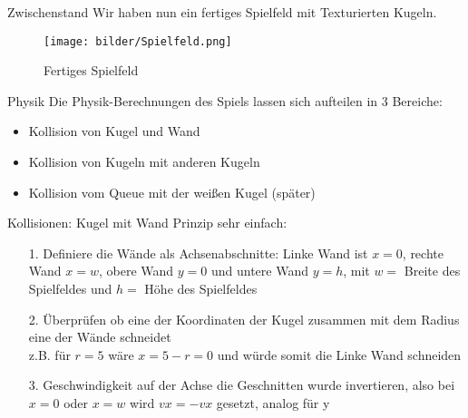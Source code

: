 \begin{frame}{Zwischenstand}
Wir haben nun ein fertiges Spielfeld mit Texturierten Kugeln.
\begin{figure}
	\caption{Fertiges Spielfeld}
	\texttt{[image: bilder/Spielfeld.png]}
\end{figure}
\end{frame}
\begin{frame}{Physik}
Die Physik-Berechnungen des Spiels lassen sich aufteilen in 3 Bereiche:
\begin{itemize}
	\item Kollision von Kugel und Wand
	\item Kollision von Kugeln mit anderen Kugeln
	\item Kollision vom Queue mit der weißen Kugel (später)
\end{itemize}
\end{frame}
\begin{frame}{Kollisionen: Kugel mit Wand}
Prinzip sehr einfach:
\begin{itemize}
	\item [1.] Definiere die Wände als Achsenabschnitte: Linke Wand ist $x=0$, rechte Wand $x=w$, obere Wand $y=0$ und untere Wand $y=h$, mit $w = $ Breite des Spielfeldes und $h = $ Höhe des Spielfeldes
	\item [2.] Überprüfen ob eine der Koordinaten der Kugel zusammen mit dem Radius eine der Wände schneidet \\
				z.B. für $r=5$ wäre $x = 5 - r = 0 $ und würde somit die Linke Wand schneiden
	\item [3.] Geschwindigkeit auf der Achse die Geschnitten wurde invertieren, also bei $x=0$ oder $x=w$ wird $vx = -vx$ gesetzt, analog für y
\end{itemize}
\end{frame}


